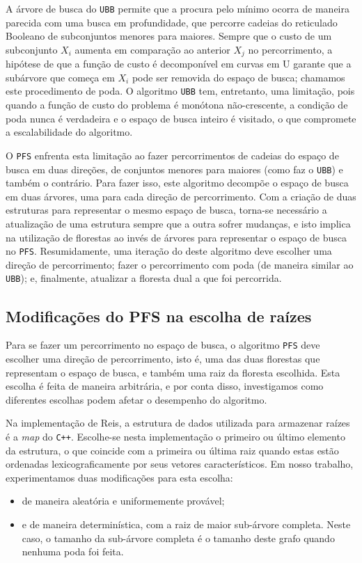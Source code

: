 \documentclass[12pt]{article}
\newcommand{\toolname}[1]{\textit{#1}}
\newcommand{\algname}[1]{\texttt{#1}}
\newcommand{\langname}[1]{\texttt{#1}}
\begin{document}
A árvore de busca do \algname{UBB} permite que a procura pelo mínimo 
ocorra de maneira parecida com uma busca em profundidade, que percorre
cadeias do reticulado Booleano de subconjuntos menores para maiores. 
Sempre que o custo de um subconjunto $X_i$ aumenta em comparação ao 
anterior $X_j$ no percorrimento, a hipótese de que a função de custo é 
decomponível em curvas em U garante que a subárvore que começa em $X_i$
pode ser removida do espaço de busca; chamamos este procedimento de
poda. O algoritmo \algname{UBB} tem, entretanto, uma limitação, pois
quando a função de custo do problema é monótona não-crescente, a 
condição de poda nunca é verdadeira e o espaço de busca inteiro é 
visitado, o que compromete a escalabilidade do algoritmo.

O \algname{PFS} enfrenta esta limitação ao fazer percorrimentos de
cadeias do espaço de busca em duas direções, de conjuntos menores para
maiores (como faz o \algname{UBB}) e também o contrário. Para fazer 
isso, este algoritmo decompõe o espaço de busca em duas árvores, uma 
para cada direção de percorrimento. Com a criação de duas estruturas 
para representar o mesmo espaço de busca, torna-se necessário a 
atualização de uma estrutura sempre que a outra sofrer mudanças, e isto
implica na utilização de florestas ao invés de árvores para representar
o espaço de busca no \algname{PFS}. Resumidamente, uma iteração do 
deste algoritmo deve escolher uma direção de percorrimento; fazer o 
percorrimento com poda (de maneira similar ao \algname{UBB}); e, 
finalmente, atualizar a floresta dual a que foi percorrida.


\subsection{Modificações do PFS na escolha de raízes}
Para se fazer um percorrimento no espaço de busca, o algoritmo 
\algname{PFS} deve escolher uma direção de percorrimento, isto é, uma
das duas florestas que representam o espaço de busca, e também uma raiz
da floresta escolhida. Esta escolha é feita de maneira arbitrária, e por
conta disso, investigamos como diferentes escolhas podem afetar o 
desempenho do algoritmo.

Na implementação de Reis, a estrutura de dados utilizada para armazenar
raízes é a \toolname{map} do \langname{C++}. Escolhe-se nesta 
implementação o primeiro ou último elemento da estrutura, o que coincide
 com a primeira ou última raiz quando estas estão ordenadas 
lexicograficamente por seus vetores característicos. Em nosso trabalho, 
experimentamos duas modificações para esta escolha:
\begin{itemize}
    \item{de maneira aleatória e uniformemente provável;}
    \item{e de maneira determinística, com a raiz de maior sub-árvore
          completa. Neste caso, o tamanho da sub-árvore completa é o 
          tamanho deste grafo quando nenhuma poda foi feita.}
\end{itemize}
\end{document}

